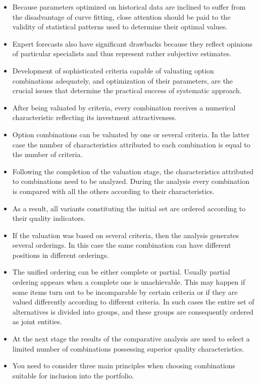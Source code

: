 \begin{itemize}
            \item Because parameters optimized on historical data are inclined to suffer from the disadvantage of curve fitting, close attention should be paid to the validity of statistical patterns used to determine their optimal values.
            \item Expert forecasts also have significant drawbacks because they reflect opinions of particular specialists and thus represent rather subjective estimates.
            \item Development of sophisticated criteria capable of valuating option combinations adequately, and optimization of their parameters, are the crucial issues that determine the practical success of systematic approach.
            \item After being valuated by criteria, every combination receives a numerical characteristic reflecting its investment attractiveness.
            \item Option combinations can be valuated by one or several criteria. In the latter case the number of characteristics attributed to each combination is equal to the number of criteria.
            \item Following the completion of the valuation stage, the characteristics attributed to combinations need to be analyzed. During the analysis every combination is compared with all the others according to their characteristics.
            \item As a result, all variants constituting the initial set are ordered according to their quality indicators.
            \item If the valuation was based on several criteria, then the analysis generates several orderings. In this case the same combination can have different positions in different orderings.
            \item The unified ordering can be either complete or partial. Usually partial ordering appears when a complete one is unachievable. This may happen if some items turn out to be incomparable by certain criteria or if they are valued differently according to different criteria. In such cases the entire set of alternatives is divided into groups, and these groups are consequently ordered as joint entities.
            \item At the next stage the results of the comparative analysis are used to select a limited number of combinations possessing superior quality characteristics.
            \item You need to consider three main principles when choosing combinations suitable for inclusion into the portfolio.

\end{itemize}
